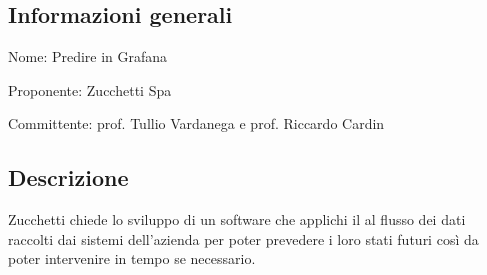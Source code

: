 \documentclass[../studio-di-fattibilita.tex]{subfiles}
\begin{document}
\subsection{Informazioni generali}%
\label{sub:informazioni_generale}
\begin{description}
  \item Nome: Predire in Grafana
  \item Proponente: Zucchetti Spa
  \item Committente: prof. Tullio Vardanega e prof. Riccardo Cardin
\end{description}

\subsection{Descrizione}%
\label{sub:descrizione}
Zucchetti chiede lo sviluppo di un software che applichi il  al flusso dei dati raccolti dai sistemi dell’azienda per poter prevedere i loro stati futuri così da poter intervenire in tempo se necessario.
\end{document}
